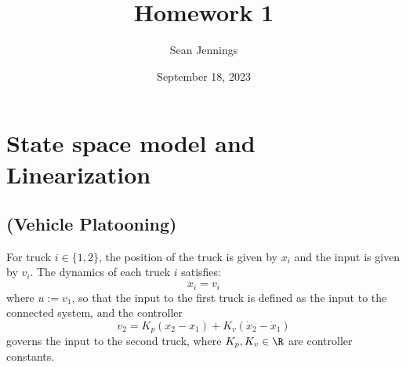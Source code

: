 \documentclass{homework}
\title{Homework 1}
\author{Sean Jennings}
\date{September 18, 2023}
\begin{document}
\maketitle

\section{State space model and Linearization}
\subsection{(Vehicle Platooning)}
For truck $i\in\{1, 2\}$, the position of the truck is given by $x_i$ and the
input is given by $v_i$. The dynamics of each truck $i$ satisfies:
\begin{equation}
    \ddot{x}_i = v_i
\end{equation}
where $u := v_1$, so that the input to the first truck is defined as the input
to the connected system, and the controller
\begin{equation}
    v_2 = K_p(x_2 - x_1) + K_v (\dot{x}_2 - \dot{x}_1)
\end{equation}
governs the input to the second truck, where $K_p,K_v \in \R$ are controller
constants.
\end{document}
